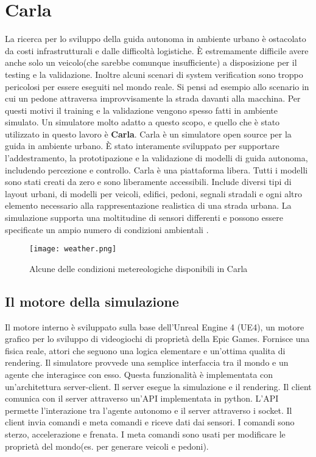 \section{Carla}
La ricerca per lo sviluppo della guida autonoma in ambiente urbano è  ostacolato da costi infrastrutturali e dalle difficoltà logistiche. È
estremamente difficile avere anche solo un veicolo(che sarebbe comunque insufficiente) a disposizione per il testing e la validazione. Inoltre
alcuni scenari di system verification sono troppo pericolosi per essere eseguiti nel mondo reale. Si pensi ad esempio allo scenario in cui
un pedone attraversa improvvisamente la strada davanti alla macchina. Per questi motivi il training e la validazione vengono spesso fatti in ambiente simulato.  Un simulatore molto adatto a questo scopo, e quello che è stato utilizzato in questo lavoro
è \textbf{Carla}. Carla è un simulatore open source per la guida in ambiente urbano. È stato interamente sviluppato per supportare l'addestramento, la prototipazione
e la validazione di modelli di guida autonoma, includendo percezione e controllo. Carla è una piattaforma libera. Tutti i modelli sono stati creati da zero
e sono liberamente accessibili. Include diversi tipi di layout urbani, di modelli per veicoli, edifici, pedoni, segnali stradali e ogni altro elemento necessario
alla rappresentazione realistica di una strada urbana.
La simulazione supporta una moltitudine di sensori differenti e possono essere specificate un ampio numero di condizioni ambientali \cite{carla}.
\begin{figure}[h]
    \texttt{[image: weather.png]}
    \caption{Alcune delle condizioni metereologiche disponibili in Carla \cite{carla}}
    \label{fig:weath}
\end{figure}

\subsection{Il motore della simulazione}
Il motore interno è sviluppato sulla base dell'Unreal Engine 4 (UE4), un motore grafico per lo sviluppo di videogiochi di proprietà della Epic Games. Fornisce una fisica reale, attori che seguono una logica elementare e un'ottima qualita di rendering.
Il simulatore provvede una semplice interfaccia tra il mondo e un agente che interagisce con esso. Questa funzionalità è implementata con un'architettura server-client.
Il server esegue la simulazione e il rendering. Il client comunica con il server attraverso un'API implementata in python. L'API permette l'interazione tra l'agente autonomo e il server
attraverso i socket. Il client invia comandi e meta comandi e riceve dati dai sensori. I comandi sono sterzo, accelerazione e frenata. I meta comandi sono usati per modificare le proprietà
del mondo(es. per generare veicoli e pedoni).
